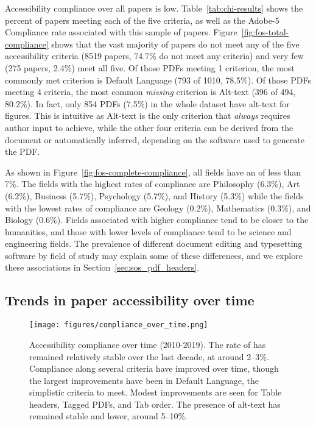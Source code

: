 Accessibility compliance over all papers is low. Table~\ref{tab:chi-results} shows the percent of papers meeting each of the five criteria, as well as the Adobe-5 Compliance rate associated with this sample of papers. Figure~\ref{fig:fos-total-compliance} shows that the vast majority of papers do not meet any of the five accessibility criteria (8519 papers, 74.7\% do not meet any criteria) and very few (275 papers, 2.4\%) meet all five. Of those PDFs meeting 1 criterion, the most commonly met criterion is Default Language (793 of 1010, 78.5\%). Of those PDFs meeting 4 criteria, the most common \textit{missing} criterion is Alt-text (396 of 494, 80.2\%). In fact, only 854 PDFs (7.5\%) in the whole dataset have alt-text for figures. This is intuitive as Alt-text is the only criterion that \textit{always} requires author input to achieve, while the other four criteria can be derived from the document or automatically inferred, depending on the software used to generate the PDF.
    
As shown in Figure~\ref{fig:fos-complete-compliance}, all fields have an  of less than 7\%. The fields with the highest rates of compliance are Philosophy (6.3\%), Art (6.2\%), Business (5.7\%), Psychology (5.7\%), and History (5.3\%) while the fields with the lowest rates of compliance are Geology (0.2\%), Mathematics (0.3\%), and Biology (0.6\%). Fields associated with higher compliance tend to be closer to the humanities, and those with lower levels of compliance tend to be science and engineering fields. The prevalence of different document editing and typesetting software by field of study may explain some of these differences, and we explore these associations in Section~\ref{sec:sos_pdf_headers}.

\subsection{Trends in paper accessibility over time}

\begin{figure}[t!]
  \centering
    \texttt{[image: figures/compliance\_over\_time.png]}
  \caption{Accessibility compliance over time (2010-2019). The rate of  has remained relatively stable over the last decade, at around 2--3\%. Compliance along several criteria have improved over time, though the largest improvements have been in Default Language, the simplistic criteria to meet. Modest improvements are seen for Table headers, Tagged PDFs, and Tab order. The presence of alt-text has remained stable and lower, around 5--10\%. 
  }
  \label{fig:fos-over-time}
\end{figure}

